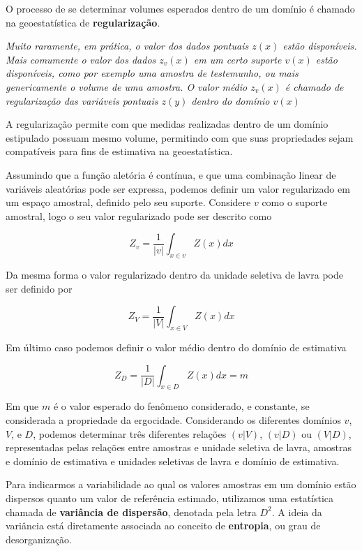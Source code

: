 O processo de se determinar volumes esperados dentro de um domínio é chamado na geoestatística de \textbf{regularização}. 

\begin{remark}
	\textit{Muito raramente, em prática, o valor dos dados pontuais $z(x)$ estão disponíveis. Mais comumente o valor dos dados $z_{v}(x)$ em um certo suporte $v(x)$ estão disponíveis, como por exemplo uma amostra de testemunho, ou mais genericamente o volume de uma amostra. O valor médio $z_{v}(x)$ é chamado de regularização das variáveis pontuais $z(y)$ dentro do domínio $v(x)$ } \citet{journel1978mining}
\end{remark}

A regularização permite com que medidas realizadas dentro de um domínio estipulado possuam mesmo volume, permitindo com que suas propriedades sejam compatíveis para fins de estimativa na geoestatística. 

Assumindo que a função aletória é contínua, e que uma combinação linear de variáveis aleatórias pode ser expressa, podemos definir um valor regularizado em um espaço amostral, definido pelo seu suporte. Considere $v$ como o suporte amostral, logo o seu valor regularizado pode ser descrito como

\begin{equation}
Z_{v} = \frac{1}{|v|}\int_{x\in v} Z(x)dx
\end{equation}

Da mesma forma o valor regularizado dentro da unidade seletiva de lavra pode ser definido por 

\begin{equation}
Z_{V} = \frac{1}{|V|}\int_{x\in V} Z(x)dx
\end{equation}

Em último caso podemos definir o valor médio dentro do domínio de estimativa

\begin{equation}
Z_{D} = \frac{1}{|D|}\int_{x\in D} Z(x)dx = m
\end{equation}

Em que $m$ é o valor esperado do fenômeno considerado, e constante, se considerada a propriedade da ergocidade. Considerando os diferentes domínios $v$, $V$, e $D$, podemos determinar três diferentes relações $(v|V)$, $(v|D)$ ou $(V|D)$, representadas pelas relações entre amostras e unidade seletiva de lavra, amostras e domínio de estimativa e unidades seletivas de lavra e domínio de estimativa.   


Para indicarmos a variabilidade ao qual os valores amostras em um domínio estão dispersos quanto um valor de referência estimado, utilizamos uma estatística chamada de \textbf{variância de dispersão}, denotada pela letra $D^{2}$. A ideia da variância está diretamente associada ao conceito de \textbf{entropia}, ou grau de desorganização. 

